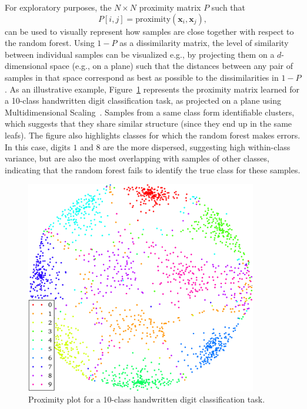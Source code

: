 For exploratory purposes, the $N\times N$ proximity matrix $P$ such that
\begin{equation}
P[i, j] = \text{proximity}(\mathbf{x}_i, \mathbf{x}_j),
\end{equation}
can be used to visually represent how samples are close together with respect
to the random forest. Using $1-P$ as a dissimilarity matrix,  the level of
similarity between individual samples can be visualized e.g., by projecting them
on a $d$-dimensional space (e.g., on a plane) such that the distances
between any pair of samples in that space correspond as best as possible to the
dissimilarities in $1-P$. As an illustrative example, Figure~\ref{fig:proximity-plot}
represents the proximity matrix learned for a 10-class handwritten digit
classification task, as projected on a plane using Multidimensional Scaling~\citep{kruskal:1964}.
Samples from a same class form identifiable clusters, which suggests that
they share similar structure (since they end up in the same leafs). The figure
also highlights classes for which the random forest makes errors. In this case,
digits $1$ and $8$ are the more dispersed, suggesting high within-class variance,
but are also the most overlapping with samples of other classes, indicating
that the random forest fails to identify the true class for these samples.

\begin{figure}
    \centering
    \includegraphics[width=0.9\textwidth]{figures/ch4_proximity_plot.pdf}
    \caption{Proximity plot for a 10-class handwritten digit classification task.}
    \label{fig:proximity-plot}
\end{figure}

